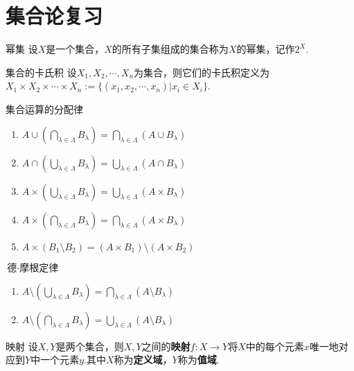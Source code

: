 \chapter{集合论复习}

\begin{definition}{幂集}
    设$X$是一个集合，$X$的所有子集组成的集合称为$X$的幂集，记作$2^X$.
\end{definition}

\begin{definition}{集合的卡氏积}
    设$X_1,X_2,\cdots,X_n$为集合，则它们的卡氏积定义为$X_1\times X_2\times\cdots\times X_n := \big\{(x_1,x_2,\cdots,x_n)|x_i\in X_i\big\}$.
\end{definition}

\begin{proposition}{集合运算的分配律}
    \wideline
    \begin{enumerate}
        \item $A\cup \left(\bigcap_{\lambda\in\Lambda}B_\lambda\right)=\bigcap_{\lambda\in\Lambda}{\left(A\cup B_\lambda\right)}$
        \item $A\cap \left(\bigcup_{\lambda\in\Lambda}B_\lambda\right)=\bigcup_{\lambda\in\Lambda}{\left(A\cap B_\lambda\right)}$
        \item $A\times \left(\bigcup_{\lambda\in\Lambda}B_\lambda\right)=\bigcup_{\lambda\in\Lambda}{\left(A\times B_\lambda\right)}$
        \item $A\times \left(\bigcap_{\lambda\in\Lambda}B_\lambda\right)=\bigcap_{\lambda\in\Lambda}{\left(A\times B_\lambda\right)}$
        \item $A\times \left(B_1\setminus B_2\right)=(A\times B_1)\setminus (A\times B_2)$
    \end{enumerate}
\end{proposition}

\begin{theorem}{$\text{德}\cdot\text{摩根定律}$}
    \wideline
    \begin{enumerate}
        \item $A\setminus \left(\bigcup_{\lambda\in\Lambda}{B_{\lambda}}\right)=\bigcap_{\lambda\in\Lambda}{\left(A\setminus B_{\lambda}\right)}$
        \item $A\setminus \left(\bigcap_{\lambda\in\Lambda}{B_{\lambda}}\right)=\bigcup_{\lambda\in\Lambda}{\left(A\setminus B_{\lambda}\right)}$
    \end{enumerate}
\end{theorem}

\begin{definition}{映射}
    设$X,Y$是两个集合，则$X,Y$之间的\textbf{映射}$f:X\to Y$将$X$中的每个元素$x$唯一地对应到$Y$中一个元素$y$.其中$X$称为\textbf{定义域}，$Y$称为\textbf{值域}.
\end{definition}

